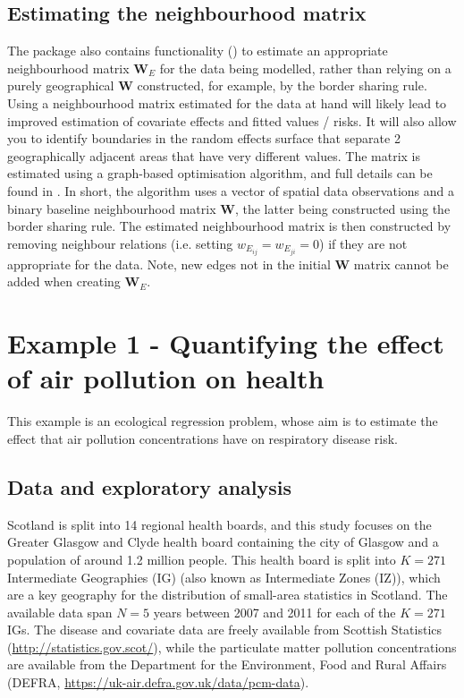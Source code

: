 \documentclass[article, nojss]{jss}
\begin{document}
\subsection{Estimating the neighbourhood matrix}
The package also contains functionality () to estimate an appropriate neighbourhood matrix $\mathbf{W}_E$ for the data being modelled, rather than relying on a purely geographical $\mathbf{W}$ constructed, for example, by the border sharing rule. Using a neighbourhood matrix estimated for the data at hand  will likely lead to improved estimation of covariate effects and fitted values / risks. It will also allow you to identify boundaries in the random effects surface that separate 2 geographically adjacent areas that have very different values. The matrix is estimated using a graph-based optimisation algorithm, and full details can be found in \cite{lee2020improved}. In short, the algorithm uses a vector of spatial data observations and a  binary baseline neighbourhood matrix $\mathbf{W}$, the latter being constructed using the border sharing rule. The estimated neighbourhood matrix is then constructed by removing neighbour relations (i.e. setting $w_{E_{ij}}= w_{E_{ji}} = 0$) if they are not appropriate for the data. Note, new edges not in the initial $\mathbf{W}$ matrix cannot be added when creating $\mathbf{W}_E$.



\section{Example 1 - Quantifying the effect of air pollution on health}\label{section5}
This example is an ecological regression problem, whose aim is to estimate the effect that air pollution concentrations have on respiratory disease risk. 


\subsection{Data and exploratory analysis}
Scotland is split into 14 regional health boards, and this study focuses on the Greater Glasgow and Clyde health board containing  the city of Glasgow and a population of around 1.2 million people. This health board is split into $K=271$ Intermediate Geographies (IG) (also known as Intermediate Zones (IZ)), which are a key geography for the distribution of small-area statistics in Scotland. The available data span $N=5$ years  between 2007 and 2011 for each of the $K=271$ IGs. The disease and covariate data are freely available from Scottish Statistics (\url{http://statistics.gov.scot/}), while the particulate matter pollution concentrations are available from the Department for the Environment, Food and Rural Affairs (DEFRA, \url{https://uk-air.defra.gov.uk/data/pcm-data}).
\end{document}
